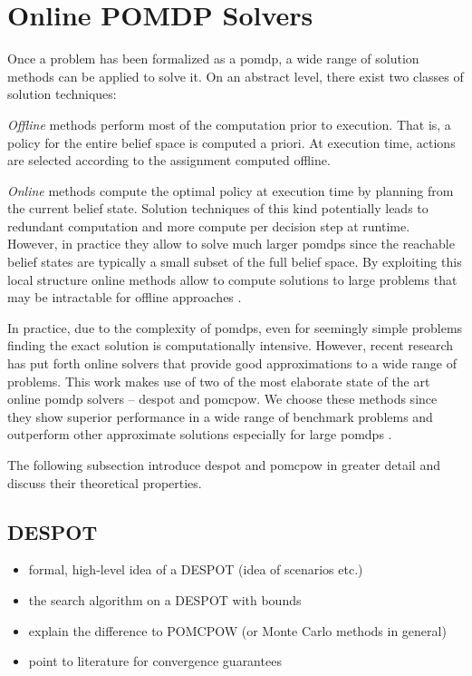 
\section{Online POMDP Solvers}\label{sec:online-pomdp-solvers}

Once a problem has been formalized as a \ac{pomdp}, a wide range of solution
methods can be applied to solve it. On an abstract level, there exist two classes
of solution techniques:

\emph{Offline} methods perform most of the computation prior to execution. That
is, a policy for the entire belief space is computed a priori. At execution
time, actions are selected according to the assignment computed offline.

\emph{Online} methods compute the optimal policy at execution time by planning
from the current belief state. Solution techniques of this kind potentially
leads to redundant computation and more compute per decision step at runtime.
However, in practice they allow to solve much larger \acp{pomdp} since the
reachable belief states are typically a small subset of the full belief space.
By exploiting this local structure online methods allow to compute solutions to
large problems that may be intractable for offline approaches
\cite{kochenderfer2015decision, silver2010pomcp, somani2013despot,
kurniawati2016online}.

In practice, due to the complexity of \acp{pomdp}, even for seemingly simple
problems finding the exact solution is computationally intensive. However,
recent research has put forth online solvers that provide good approximations
to a wide range of problems. This work makes use of two of the most elaborate
state of the art online \ac{pomdp} solvers -- \ac{despot} and \ac{pomcpow}. We
choose these methods since they show superior performance in a wide range of
benchmark problems and outperform other approximate solutions especially for
large \acp{pomdp} \cite{somani2013despot, sunberg2018online}.

The following subsection introduce \ac{despot} and \ac{pomcpow} in greater
detail and discuss their theoretical properties.

\subsection{DESPOT}

\begin{itemize}
  \item formal, high-level idea of a DESPOT (idea of scenarios etc.)
  \item the search algorithm on a DESPOT with bounds
  \item explain the difference to POMCPOW (or Monte Carlo methods in general)
  \item point to literature for convergence guarantees
\end{itemize}

